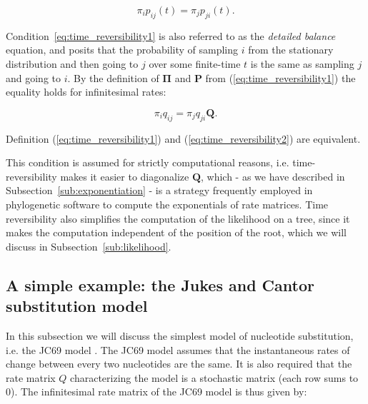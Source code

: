 \begin{equation}
\pi_{i}p_{ij}(t)=\pi_{j}p_{ji}(t).
\label{eq:time_reversibility1}
\end{equation}

\noindent
Condition~\ref{eq:time_reversibility1} is also referred to as the \emph{detailed balance} equation, and posits that the probability of sampling $i$ from the stationary distribution and then going to $j$ over some finite-time $t$ is the same as sampling $j$ and going to $i$. 
By the definition of $\mathbf{\Pi}$ and $\mathbf{P}$ from (\ref{eq:time_reversibility1}) the equality holds for infinitesimal rates:

\begin{equation}
\pi_{i}q_{ij}=\pi_{j}q_{ji}\mathbf{Q}.
\label{eq:time_reversibility2}
\end{equation}

Definition (\ref{eq:time_reversibility1}) and (\ref{eq:time_reversibility2}) are equivalent.

This condition is assumed for strictly computational reasons, i.e. time-reversibility makes it easier to diagonalize $\mathbf{Q}$, which - as we have described in Subsection~\ref{sub:exponentiation} - is a strategy frequently employed in phylogenetic software to compute the exponentials of rate matrices.
Time reversibility also simplifies the computation of the likelihood on a tree, since it makes the computation independent of the position of the root, which we will discuss in Subsection~\ref{sub:likelihood}.


\subsection{A simple example: the Jukes and Cantor substitution model\label{sub:jc69}}

In this subsection we will discuss the simplest model of nucleotide substitution, i.e. the JC69 model \citep{Jukes1969}.
The JC69 model assumes that the instantaneous rates of change between every two nucleotides are the same.
It is also required that the rate matrix $Q$ characterizing the model is a stochastic matrix (each row sums to 0).
The infinitesimal rate matrix of the JC69 model is thus given by:

